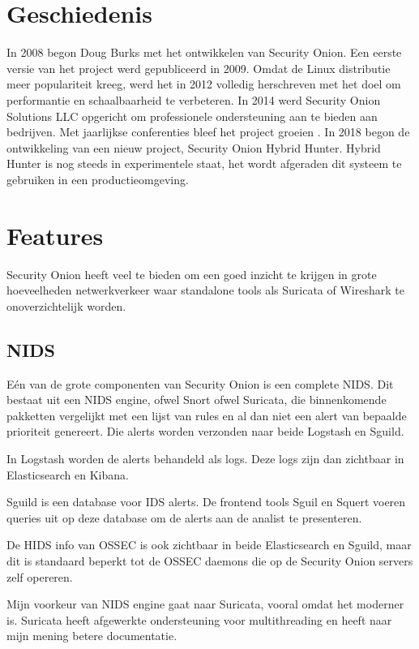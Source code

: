 \documentclass[a4paper,12pt]{report}
\begin{document}
\section{Geschiedenis}
In 2008 begon Doug Burks met het ontwikkelen van Security Onion.
Een eerste versie van het project werd gepubliceerd in 2009.
Omdat de Linux distributie meer populariteit kreeg, werd het in 2012 volledig herschreven met het doel om performantie en schaalbaarheid te verbeteren.
In 2014 werd Security Onion Solutions LLC opgericht om professionele ondersteuning aan te bieden aan bedrijven.
Met jaarlijkse conferenties bleef het project groeien \autocite{so:sos}.
In 2018 begon de ontwikkeling van een nieuw project, Security Onion Hybrid Hunter.
Hybrid Hunter is nog steeds in experimentele staat, het wordt afgeraden dit systeem te gebruiken in een productieomgeving.

\section{Features}
Security Onion heeft veel te bieden om een goed inzicht te krijgen in grote hoeveelheden netwerkverkeer waar standalone tools als Suricata of Wireshark te onoverzichtelijk worden.

\subsection{NIDS}
Eén van de grote componenten van Security Onion is een complete NIDS.
Dit bestaat uit een NIDS engine, ofwel Snort ofwel Suricata, die binnenkomende pakketten vergelijkt met een lijst van rules en al dan niet een alert van bepaalde prioriteit genereert.
Die alerts worden verzonden naar beide Logstash en Sguild.

In Logstash worden de alerts behandeld als logs.
Deze logs zijn dan zichtbaar in Elasticsearch en Kibana.

Sguild is een database voor IDS alerts.
De frontend tools Sguil en Squert voeren queries uit op deze database om de alerts aan de analist te presenteren.

De HIDS info van OSSEC is ook zichtbaar in beide Elasticsearch en Sguild, maar dit is standaard beperkt tot de OSSEC daemons die op de Security Onion servers zelf opereren.

Mijn voorkeur van NIDS engine gaat naar Suricata, vooral omdat het moderner is.
Suricata heeft afgewerkte ondersteuning voor multithreading en heeft naar mijn mening betere documentatie.
\end{document}
